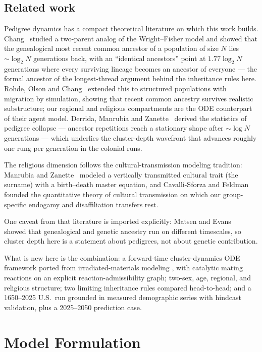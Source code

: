 \documentclass[11pt,a4paper]{article}
\begin{document}
\subsection{Related work}
Pedigree dynamics has a compact theoretical literature on which this
work builds.  Chang~\cite{chang1999} studied a two-parent analog of the
Wright--Fisher model and showed that the genealogical most recent
common ancestor of a population of size $N$ lies $\sim\!\log_2 N$
generations back, with an ``identical ancestors'' point at
$1.77\log_2 N$ generations where every surviving lineage becomes an
ancestor of everyone --- the formal ancestor of the longest-thread
argument behind the inheritance rules here.  Rohde, Olson and
Chang~\cite{rohde2004} extended this to structured populations with
migration by simulation, showing that recent common ancestry survives
realistic substructure; our regional and religious compartments are the
ODE counterpart of their agent model.  Derrida, Manrubia and
Zanette~\cite{derrida1999,derrida2000} derived the statistics of
pedigree collapse --- ancestor repetitions reach a stationary shape
after $\sim\!\log N$ generations --- which underlies the
cluster-depth wavefront that advances roughly one rung per generation
in the colonial runs.

The religious dimension follows the cultural-transmission modeling
tradition: Manrubia and Zanette~\cite{manrubia2002} modeled a vertically
transmitted cultural trait (the surname) with a birth--death master
equation, and Cavalli-Sforza and Feldman~\cite{cavalli-sforza1981}
founded the quantitative theory of cultural transmission on which our
group-specific endogamy and disaffiliation transfers rest.

One caveat from that literature is imported explicitly: Matsen and
Evans~\cite{matsen2008} showed that genealogical and genetic ancestry
run on different timescales, so cluster depth here is a statement about
pedigrees, not about genetic contribution.

What is new here is the combination: a forward-time cluster-dynamics
ODE framework ported from irradiated-materials modeling
\cite{radcluster}, with catalytic mating reactions on an explicit
reaction-admissibility graph; two-sex, age, regional, and religious
structure; two limiting inheritance rules compared head-to-head; and a
1650--2025 U.S.\ run grounded in measured demographic series with
hindcast validation, plus a 2025--2050 prediction case.
\section{Model Formulation}
\label{sec:model}
\end{document}
